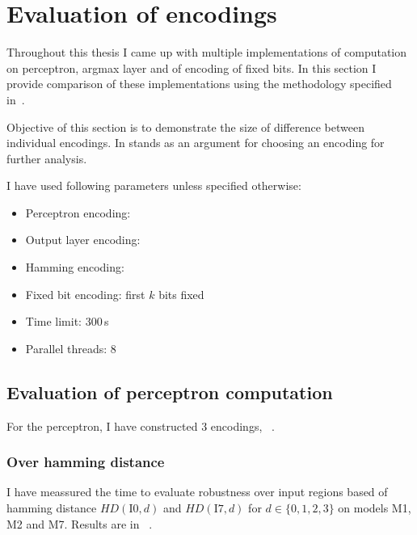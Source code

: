 \section{Evaluation of encodings}

Throughout this thesis I came up with multiple implementations of
computation on perceptron, argmax layer and of encoding of fixed bits.
In this section I provide comparison of these
implementations using the methodology specified in~.

Objective of this section is to demonstrate the size of difference between
individual encodings. In stands as an argument for choosing an encoding
for further analysis.

I have used following parameters unless specified otherwise:
\begin{itemize}
    \setlength{\itemsep}{0pt}
    \item Perceptron encoding: 
    \item Output layer encoding: 
    \item Hamming encoding: 
    \item Fixed bit encoding: first $k$ bits fixed
    \item Time limit: 300\,s
    \item Parallel threads: 8
\end{itemize}

\subsection{Evaluation of perceptron computation}

For the perceptron, I have constructed 3 encodings,%
~.

\subsubsection{Over hamming distance}

I have meassured the time to evaluate robustness over input regions
based of hamming distance $HD(\text{I0}, d)$ and $HD(\text{I7}, d)$
for $d\in\{0,1,2,3\}$ on models M1, M2 and M7. Results are in%
~.

